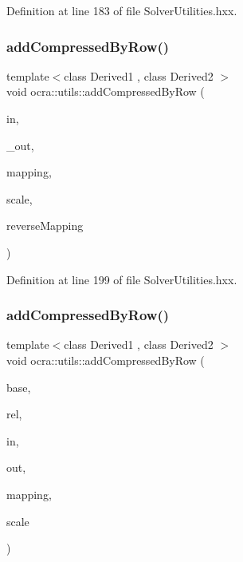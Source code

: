 Definition at line 183 of file Solver\+Utilities.\+hxx.

\hypertarget{namespaceocra_1_1utils_a8256ba2ed6ce4d6066c03631e64e27f9}{}\label{namespaceocra_1_1utils_a8256ba2ed6ce4d6066c03631e64e27f9} 
\subsubsection{\texorpdfstring{add\+Compressed\+By\+Row()}{addCompressedByRow()}\hspace{0.1cm}{\footnotesize\ttfamily [1/2]}}
{\footnotesize\ttfamily template$<$class Derived1 , class Derived2 $>$ \\
void ocra\+::utils\+::add\+Compressed\+By\+Row (\begin{DoxyParamCaption}\item[{const Matrix\+Base$<$ Derived1 $>$ \&}]{in,  }\item[{Matrix\+Base$<$ Derived2 $>$ const \&}]{\+\_\+out,  }\item[{const std\+::vector$<$ int $>$ \&}]{mapping,  }\item[{double}]{scale,  }\item[{bool}]{reverse\+Mapping }\end{DoxyParamCaption})\hspace{0.3cm}{\ttfamily [inline]}}



Definition at line 199 of file Solver\+Utilities.\+hxx.

\hypertarget{namespaceocra_1_1utils_a0ca59cf5c0fd0b8e92a0aa53d85e0aca}{}\label{namespaceocra_1_1utils_a0ca59cf5c0fd0b8e92a0aa53d85e0aca} 
\subsubsection{\texorpdfstring{add\+Compressed\+By\+Row()}{addCompressedByRow()}\hspace{0.1cm}{\footnotesize\ttfamily [2/2]}}
{\footnotesize\ttfamily template$<$class Derived1 , class Derived2 $>$ \\
void ocra\+::utils\+::add\+Compressed\+By\+Row (\begin{DoxyParamCaption}\item[{const \hyperlink{classocra_1_1Variable}{Variable} \&}]{base,  }\item[{const \hyperlink{classocra_1_1Variable}{Variable} \&}]{rel,  }\item[{const Matrix\+Base$<$ Derived1 $>$ \&}]{in,  }\item[{Matrix\+Base$<$ Derived2 $>$ const \&}]{out,  }\item[{std\+::vector$<$ int $>$ \&}]{mapping,  }\item[{double}]{scale }\end{DoxyParamCaption})\hspace{0.3cm}{\ttfamily [inline]}}



